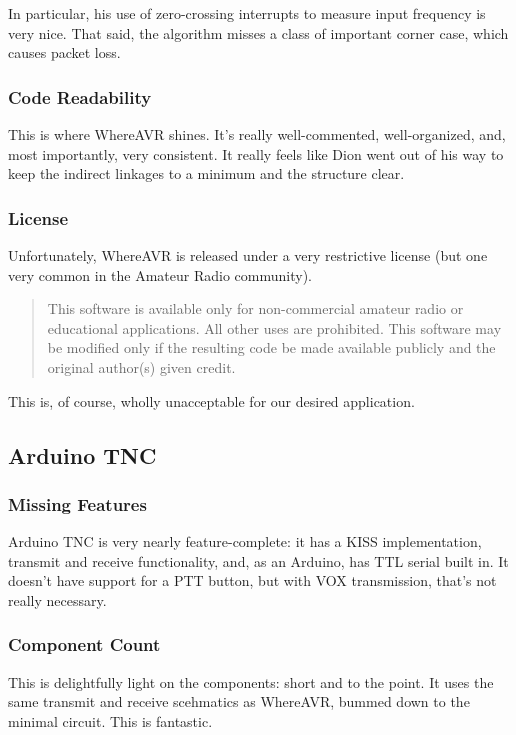 \documentclass{article}
\begin{document}
In particular, his use of zero-crossing interrupts to measure input
frequency is very nice.  That said, the algorithm misses a class of
important corner case, which causes packet loss.

\subsubsection{Code Readability}

This is where WhereAVR shines.  It's really well-commented,
well-organized, and, most importantly, very consistent.  It really
feels like Dion went out of his way to keep the indirect linkages to a
minimum and the structure clear.


\subsubsection{License}

Unfortunately, WhereAVR is released under a very restrictive license
(but one very common in the Amateur Radio community).
\begin{quote}
  This software is available only for non-commercial amateur radio or
  educational applications.  All other uses are prohibited.  This
  software may be modified only if the resulting code be made
  available publicly and the original author(s) given credit.
\end{quote}

This is, of course, wholly unacceptable for our desired application.

\subsection{Arduino TNC}
\subsubsection{Missing Features}

Arduino TNC\cite{ArduinoTNC} is very nearly feature-complete: it has a
KISS implementation, transmit and receive functionality, and, as an
Arduino, has TTL serial built in.  It doesn't have support for a PTT
button, but with VOX transmission, that's not really necessary.

\subsubsection{Component Count}

This is delightfully light on the components: short and to the point.
It uses the same transmit and receive scehmatics as WhereAVR, bummed
down to the minimal circuit.  This is fantastic.
\end{document}
